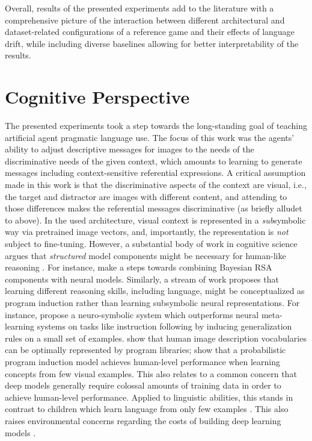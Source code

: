 Overall, results of the presented experiments add to the literature with a comprehensive picture of the interaction between different architectural and dataset-related configurations of a reference game and their effects of language drift, while including diverse baselines allowing for better interpretability of the results. 


\section{Cognitive Perspective}
The presented experiments took a step towards the long-standing goal of teaching artificial agent pragmatic language use. The focus of this work was the agents' ability to adjust descriptive messages for images to the needs of the discriminative needs of the given context, which amounts to learning to generate messages including context-sensitive referential expressions. A critical assumption made in this work is that the discriminative aspects of the context are visual, i.e., the target and distractor are images with different content, and attending to those differences makes the referential messages discriminative (as briefly alludet to above). In the used architecture, visual context is represented in a \emph{sub}symbolic way via pretrained image vectors, and, importantly, the representation is \emph{not} subject to fine-tuning. However, a substantial body of work in cognitive science argues that \emph{structured} model components might be necessary for human-like reasoning \parencite[e.~g.,][]{tenenbaum2011grow, lake2017building}. For instance, \cite{monroe2015learning} make a steps towards combining Bayesian RSA components with neural models.
Similarly, a stream of work proposes that learning different reasoning skills, including language, might be conceptualized as program induction rather than learning subsymbolic neural representations. For instance, \cite{nye2020learning} propose a neuro-symbolic system which outperforms neural meta-learning systems on tasks like instruction following by inducing generalization rules on a small set of examples. \cite{wong2022identifying} show that human image description vocabularies can be optimally represented by program libraries; \cite{lake2015human} show that a probabilistic program induction model achieves human-level performance when learning concepts from few visual examples. This also relates to a common concern that deep models generally require colossal amounts of training data in order to achieve human-level performance. Applied to linguistic abilities, this stands in contrast to children which learn language from only few examples \parencite[e.~g.,][]{xu2007word}. This also raises environmental concerns regarding the costs of building deep learning models \parencite{bender2021dangers}.  
